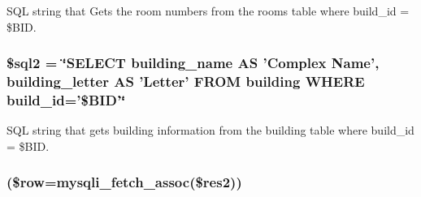 \-S\-Q\-L string that \-Gets the room numbers from the rooms table where build\-\_\-id = \$\-B\-I\-D. \hypertarget{upRoomsTable_8php_a1ad0ffe3fa0755e56a1a6bb40c232b8a}{
\subsubsection[{\$sql2}]{\setlength{\rightskip}{0pt plus 5cm}\$sql2 = \char`\"{}\-S\-E\-L\-E\-C\-T building\-\_\-name \-A\-S '\-Complex \-Name', building\-\_\-letter \-A\-S '\-Letter' \-F\-R\-O\-M building \-W\-H\-E\-R\-E build\-\_\-id='\$\-B\-I\-D'\char`\"{}}}\label{upRoomsTable_8php_a1ad0ffe3fa0755e56a1a6bb40c232b8a}
\-S\-Q\-L string that gets building information from the building table where build\-\_\-id = \$\-B\-I\-D. \hypertarget{upRoomsTable_8php_ac3862ddd2ba0a132de05b14eab1a8e7d}{
\subsubsection[{while}]{(\$row=mysqli\-\_\-fetch\-\_\-assoc(\$res2))}}\label{upRoomsTable_8php_ac3862ddd2ba0a132de05b14eab1a8e7d}
